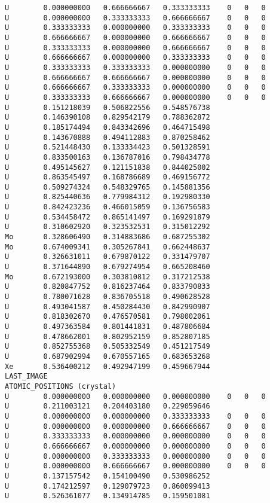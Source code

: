 \begin{lstlisting}
U        0.000000000   0.666666667   0.333333333    0   0   0
U        0.000000000   0.333333333   0.666666667    0   0   0
U        0.333333333   0.000000000   0.333333333    0   0   0
U        0.666666667   0.000000000   0.666666667    0   0   0
U        0.333333333   0.000000000   0.666666667    0   0   0
U        0.666666667   0.000000000   0.333333333    0   0   0
U        0.333333333   0.333333333   0.000000000    0   0   0
U        0.666666667   0.666666667   0.000000000    0   0   0
U        0.666666667   0.333333333   0.000000000    0   0   0
U        0.333333333   0.666666667   0.000000000    0   0   0
U        0.151218039   0.506822556   0.548576738
U        0.146390108   0.829542179   0.788362872
U        0.185174494   0.843342696   0.464715498
U        0.143670888   0.494112883   0.870258462
U        0.521448430   0.133334423   0.501328591
U        0.833500163   0.136787016   0.798434778
U        0.495145627   0.121151838   0.844025002
U        0.863545497   0.168786689   0.469156772
U        0.509274324   0.548329765   0.145881356
U        0.825440636   0.779984312   0.192980330
U        0.842423236   0.466015059   0.136756583
U        0.534458472   0.865141497   0.169291879
U        0.310602920   0.323532531   0.315012292
Mo       0.328606490   0.314883686   0.687255302
Mo       0.674009341   0.305267841   0.662448637
U        0.326631011   0.679870122   0.331479707
U        0.371644890   0.679274954   0.665208460
Mo       0.672193000   0.303810812   0.317212538
U        0.820847752   0.816237464   0.833790833
U        0.780071628   0.836705518   0.490628528
U        0.493041587   0.450284430   0.842990907
U        0.818302670   0.476570581   0.798002061
U        0.497363584   0.801441831   0.487806684
U        0.478662001   0.802952159   0.852807185
U        0.852755368   0.505332549   0.451217549
U        0.687902994   0.670557165   0.683653268
Xe       0.536400212   0.492947199   0.459667944
LAST_IMAGE
ATOMIC_POSITIONS (crystal)
U        0.000000000   0.000000000   0.000000000    0   0   0
U        0.211003121   0.204403180   0.229059646
U        0.000000000   0.000000000   0.333333333    0   0   0
U        0.000000000   0.000000000   0.666666667    0   0   0
U        0.333333333   0.000000000   0.000000000    0   0   0
U        0.666666667   0.000000000   0.000000000    0   0   0
U        0.000000000   0.333333333   0.000000000    0   0   0
U        0.000000000   0.666666667   0.000000000    0   0   0
U        0.137157542   0.154100490   0.530986252
U        0.174212597   0.129079723   0.860099413
U        0.526361077   0.134914785   0.159501081

\end{lstlisting}

